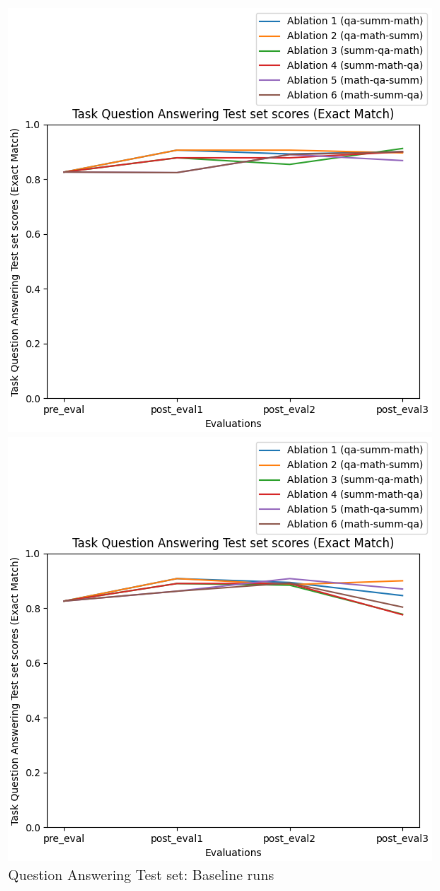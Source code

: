 \begin{figure}[H]
    \centering
    \begin{minipage}{0.45\textwidth}
        \centering
        \includegraphics[width=1.1\textwidth]{Figures/results/trace_baseline_graphs/task_eval/qa_test_Test_baseline.png} %
        \captionsetup{width=1.1\textwidth}
        \caption{Question Answering Test set: Baseline runs}
        \label{QATestBaseline}
    \end{minipage}\hfill
    \begin{minipage}{0.45\textwidth}
        \centering
        \includegraphics[width=1.1\textwidth]{Figures/results/trace_mitigation_graphs/task_eval/qa_test_Test_mitigation.png} %

\end{minipage}
\end{figure}
